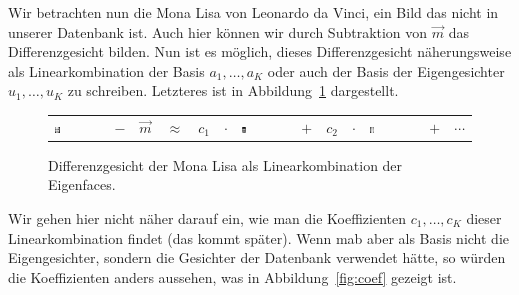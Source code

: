 Wir betrachten nun die Mona Lisa von Leonardo da Vinci, ein Bild das nicht in unserer Datenbank ist.
Auch hier können wir durch Subtraktion von $\vec m$ das Differenzgesicht bilden.
Nun ist es möglich, dieses Differenzgesicht näherungsweise als Linearkombination der Basis $a_1,\ldots,a_K$ oder auch der Basis der Eigengesichter $u_1,\ldots,u_K$ zu schreiben.
Letzteres ist in Abbildung~\ref{fig:eigen_basis} dargestellt.
\begin{figure}[ht]
	\centering
	\begin{tabular}{m{1.8cm} c c c c c m{2cm} c c c m{2cm} c c}
		\includegraphics[width=0.1\textwidth]{images/eigenfaces/mona_lisa_original} &
		$-$ & $\vec m$ & $\approx$ & $c_1$ & $\cdot$ & \includegraphics[width=0.1\textwidth]{images/eigenfaces/eigenface00}
		& $+$ & $c_2$ & $\cdot$ & \includegraphics[width=0.1\textwidth]{images/eigenfaces/eigenface01} & $+$ & $\cdots$
	\end{tabular}
	\caption{Differenzgesicht der Mona Lisa als Linearkombination der Eigenfaces.}
	\label{fig:eigen_basis}
\end{figure}
Wir gehen hier nicht näher darauf ein, wie man die Koeffizienten $c_1,\ldots,c_K$ dieser Linearkombination findet (das kommt später).
Wenn mab aber als Basis nicht die Eigengesichter, sondern die Gesichter der Datenbank verwendet hätte, so würden die Koeffizienten anders aussehen, was in Abbildung~\ref{fig:coef} gezeigt ist.

